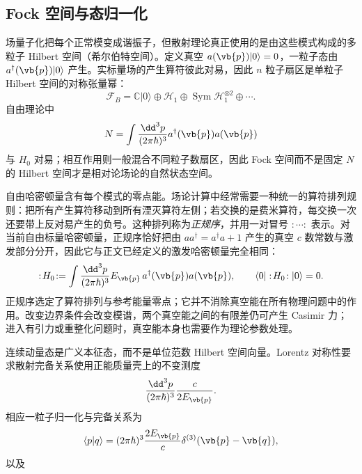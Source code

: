 \subsection{Fock 空间与态归一化}

场量子化把每个正常模变成谐振子，但散射理论真正使用的是由这些模式构成的多粒子 Hilbert 空间（希尔伯特空间）。定义真空 $a(\vb{p})|0\rangle=0$，一粒子态由 $a^\dagger(\vb{p})|0\rangle$ 产生。实标量场的产生算符彼此对易，因此 $n$ 粒子扇区是单粒子 Hilbert 空间的对称张量幂：
\begin{equation*}
\mathscr F_B
=\mathbb C|0\rangle\oplus\mathcal H_1
\oplus\operatorname{Sym}\mathcal H_1^{\otimes2}\oplus\cdots .
\end{equation*}
自由理论中
\begin{equation*}
N=\int\frac{\dd^3 p}{(2\pi\hbar)^3}a^\dagger(\vb{p})a(\vb{p})
\end{equation*}
与 $H_0$ 对易；相互作用则一般混合不同粒子数扇区，因此 Fock 空间而不是固定 $N$ 的 Hilbert 空间才是相对论场论的自然状态空间。

自由哈密顿量含有每个模式的零点能。场论计算中经常需要一种统一的算符排列规则：把所有产生算符移动到所有湮灭算符左侧；若交换的是费米算符，每交换一次还要带上反对易产生的负号。这种排列称为\emph{正规序}，并用一对冒号 $:\!\cdots\!:$ 表示。对当前自由标量哈密顿量，正规序恰好把由 $aa^\dagger=a^\dagger a+1$ 产生的真空 $c$ 数常数与激发部分分开，因此它与正文已经定义的激发哈密顿量完全相同：
\begin{equation}
{
:\!H_0\!:
=\int\frac{\dd^3 p}{(2\pi\hbar)^3}
E_{\vb{p}}\,a^\dagger(\vb{p})a(\vb{p}),
\qquad \langle0|:\!H_0\!:|0\rangle=0.}
\label{eq:normal-H-r2}
\end{equation}
正规序选定了算符排列与参考能量零点；它并不消除真空能在所有物理问题中的作用。改变边界条件会改变模谱，两个真空能之间的有限差仍可产生 Casimir 力；进入有引力或重整化问题时，真空能本身也需要作为理论参数处理。

连续动量态是广义本征态，而不是单位范数 Hilbert 空间向量。Lorentz 对称性要求散射完备关系使用正能质量壳上的不变测度
\begin{equation}
{
\frac{\dd^3 p}{(2\pi\hbar)^3}\frac{c}{2E_{\vb{p}}}.}
\label{eq:lorentz-measure-r2}
\end{equation}
相应一粒子归一化与完备关系为
\begin{equation*}
\langle p|q\rangle
=(2\pi\hbar)^3\frac{2E_{\vb{p}}}{c}
\delta^{(3)}(\vb{p}-\vb{q}),
\end{equation*}
以及


